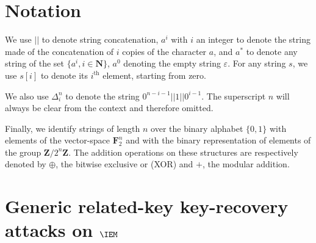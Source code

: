 
\section{Notation}

We use $||$ to denote string concatenation, $a^i$ with $i$ an integer
to denote the string
made of the concatenation of $i$ copies of the character $a$, and $a^*$
to denote any string of the set $\{a^i, i \in \mathbf{N}\}$, $a^0$
denoting the empty string $\varepsilon$. For any string $s$, we use
$s[i]$ to denote its $i^\text{th}$ element, starting from zero.

We also use $\Delta_i^n$ to denote the string
$0^{n-i-1} || 1 || 0^{i - 1}$. The superscript $n$ will always
be clear from the context and therefore omitted.

Finally, we identify strings of length $n$ over the binary alphabet $\{0,1\}$ with elements of
the vector-space $\mathbf{F}_2^n$ and with the binary representation of elements of
the group $\mathbf{Z}/2^n\mathbf{Z}$. The addition operations on these structures
are respectively denoted by $\oplus$, the bitwise exclusive or (XOR) and $+$, the modular addition.

\section{Generic related-key key-recovery attacks on $\IEM$}
\label{sec:gen}



